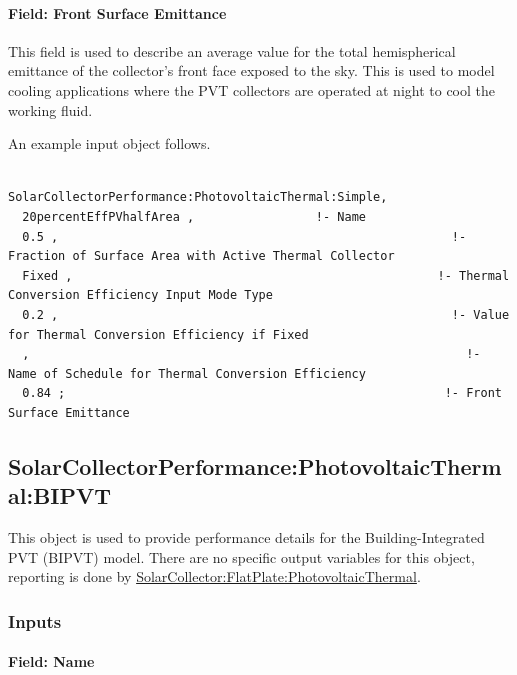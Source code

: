 \paragraph{Field: Front Surface Emittance}\label{field-front-surface-emittance}

This field is used to describe an average value for the total hemispherical emittance of the collector's front face exposed to the sky. This is used to model cooling applications where the PVT collectors are operated at night to cool the working fluid.

An example input object follows.

\begin{lstlisting}

SolarCollectorPerformance:PhotovoltaicThermal:Simple,
  20percentEffPVhalfArea ,                 !- Name
  0.5 ,                                                       !- Fraction of Surface Area with Active Thermal Collector
  Fixed ,                                                   !- Thermal Conversion Efficiency Input Mode Type
  0.2 ,                                                       !- Value for Thermal Conversion Efficiency if Fixed
  ,                                                             !- Name of Schedule for Thermal Conversion Efficiency
  0.84 ;                                                     !- Front Surface Emittance
\end{lstlisting}

\subsection{SolarCollectorPerformance:PhotovoltaicThermal:BIPVT}\label{solarcollectorperformancephotovoltaicthermalBIPVT}

This object is used to provide performance details for the Building-Integrated PVT (BIPVT) model. There are no specific output variables for this object, reporting is done by \hyperref[solarcollectorflatplatephotovoltaicthermal]{SolarCollector:FlatPlate:PhotovoltaicThermal}.


\subsubsection{Inputs}\label{BIPVT-Inputs}

\paragraph{Field: Name}\label{BIPVT-field-name}


